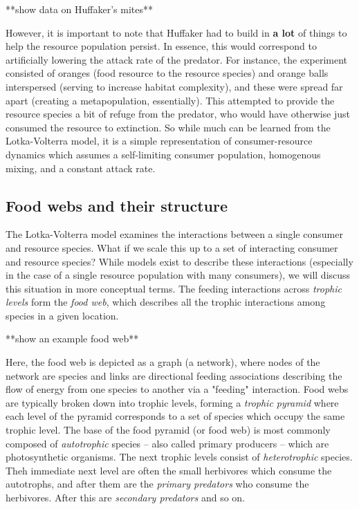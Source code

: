 \documentclass[12pt]{article}
\begin{document}
**show data on Huffaker's mites**


However, it is important to note that Huffaker had to build in \textbf{a lot} of things to help the resource population persist. In essence, this would correspond to artificially lowering the attack rate of the predator. For instance, the experiment consisted of oranges (food resource to the resource species) and orange balls interspersed (serving to increase habitat complexity), and these were spread far apart (creating a metapopulation, essentially). This attempted to provide the resource species a bit of refuge from the predator, who would have otherwise just consumed the resource to extinction. So while much can be learned from the Lotka-Volterra model, it is a simple representation of consumer-resource dynamics which assumes a self-limiting consumer population, homogenous mixing, and a constant attack rate. 















\bigskip
\subsection*{Food webs and their structure}

The Lotka-Volterra model examines the interactions between a single consumer and resource species. What if we scale this up to a set of interacting consumer and resource species? While models exist to describe these interactions (especially in the case of a single resource population with many consumers), we will discuss this situation in more conceptual terms. The feeding interactions across \textit{trophic levels} form the \textit{food web}, which describes all the trophic interactions among species in a given location. 



**show an example food web**




Here, the food web is depicted as a graph (a network), where nodes of the network are species and links are directional feeding associations describing the flow of energy from one species to another via a "feeding" interaction. Food webs are typically broken down into trophic levels, forming a \textit{trophic pyramid} where each level of the pyramid corresponds to a set of species which occupy the same trophic level. The base of the food pyramid (or food web) is most commonly composed of \textit{autotrophic} species -- also called primary producers -- which are photosynthetic organisms. The next trophic levels consist of \textit{heterotrophic} species. Theh immediate next level are often the small herbivores which consume the autotrophs, and after them are the \textit{primary predators} who consume the herbivores. After this are \textit{secondary predators} and so on. 
\end{document}
